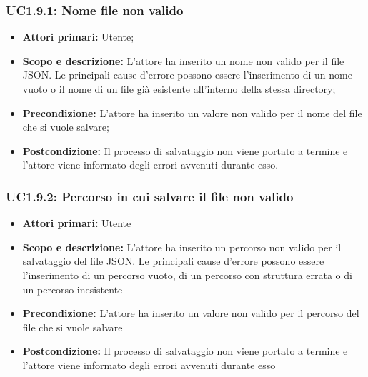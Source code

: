 \subsubsection{UC1.9.1: Nome file non valido} 
\begin{itemize} 
	\item{\textbf{Attori primari:} Utente;} 
	\item{\textbf{Scopo e descrizione:} L'attore ha inserito un nome non valido per il file JSON. Le principali cause d'errore possono essere l'inserimento di un nome vuoto o il nome di un file già esistente all'interno della stessa directory;} 
	\item{\textbf{Precondizione:} L'attore ha inserito un valore non valido per il nome del file che si vuole salvare;} 
	\item{\textbf{Postcondizione:} Il processo di salvataggio non viene portato a termine e l'attore viene informato degli errori avvenuti durante esso.} 
\end{itemize} 
\subsubsection{UC1.9.2: Percorso in cui salvare il file non valido} 
\begin{itemize} 
	\item{\textbf{Attori primari:} Utente} 
	\item{\textbf{Scopo e descrizione:} L'attore ha inserito un percorso non valido per il salvataggio del file JSON. Le principali cause d'errore possono essere l'inserimento di un percorso vuoto, di un percorso con struttura errata o di un percorso inesistente} 
	\item{\textbf{Precondizione:} L'attore ha inserito un valore non valido per il percorso del file che si vuole salvare} 
	\item{\textbf{Postcondizione:} Il processo di salvataggio non viene portato a termine e l'attore viene informato degli errori avvenuti durante esso} 
\end{itemize} 